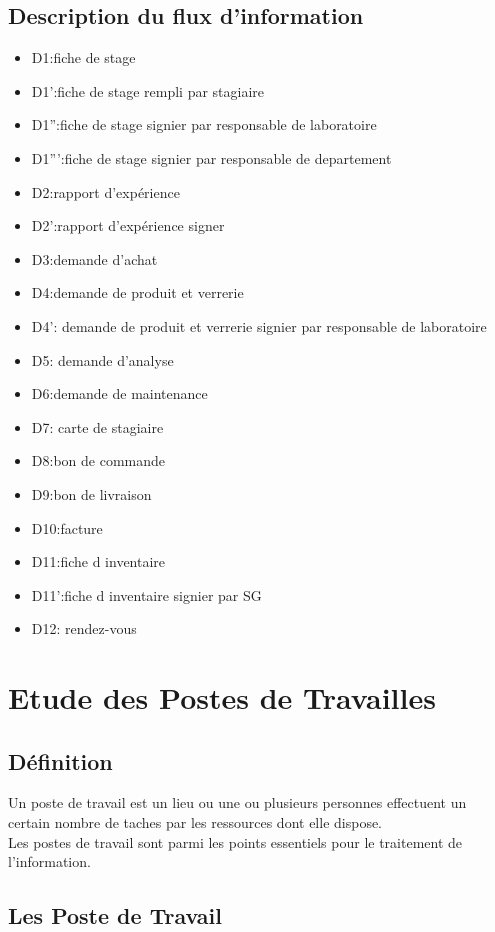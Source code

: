 \subsection{Description du flux d'information}
\begin{itemize}
    \item D1:fiche de stage 
    \item D1':fiche de stage rempli par stagiaire
    \item D1'':fiche de stage signier par responsable de laboratoire 
    \item D1''':fiche de stage signier par responsable de departement 
    \item D2:rapport d'expérience 
    \item D2':rapport d'expérience signer
    \item D3:demande d'achat 
    \item D4:demande de produit et verrerie 
    \item D4': demande de produit et verrerie signier par responsable de laboratoire 
    \item D5: demande d'analyse 
    \item D6:demande de maintenance 
    \item D7: carte de stagiaire 
    \item D8:bon de commande 
    \item D9:bon de livraison 
    \item D10:facture 
    \item D11:fiche d inventaire
    \item D11':fiche d inventaire signier par SG
    \item D12: rendez-vous
\end{itemize}

\section{Etude des Postes de Travailles}
\subsection{Définition}
Un poste de travail est un lieu ou une ou plusieurs personnes effectuent un
certain nombre de taches par les ressources dont elle dispose.\\
Les postes de travail sont parmi les points essentiels pour le traitement de
l'information.
\subsection{Les Poste de Travail}



